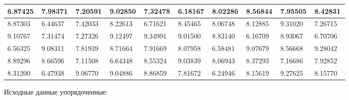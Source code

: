 \begin{changemargin}{-4cm}{0cm}
{\begin{tabular}{|p{0.08\linewidth}|p{0.08\linewidth}|p{0.08\linewidth}|p{0.08\linewidth}|p{0.08\linewidth}|p{0.08\linewidth}|p{0.08\linewidth}|p{0.08\linewidth}|p{0.08\linewidth}|p{0.08\linewidth}|}
\hline%
6.87425&7.98371&7.20591&9.02850&7.32478&6.18167&8.02286&8.56844&7.95505&8.42831\\%
\hline%
8.87303&6.44637&7.42033&8.22613&6.71621&8.45465&8.06748&8.12885&9.31020&7.26715\\%
\hline%
9.10767&7.31474&7.27326&9.12497&9.34991&9.01500&8.83140&6.16709&8.93067&6.70706\\%
\hline%
6.56325&9.08311&7.81939&8.71664&7.91669&8.07958&6.58481&9.07679&8.56668&9.28042\\%
\hline%
8.89296&8.66596&7.11508&6.64348&8.55324&9.03839&8.06943&8.37293&7.16686&7.92852\\%
\hline%
8.31200&6.47938&9.06770&9.04886&8.86859&7.81672&6.24946&8.15619&9.27625&8.15770\\%
\hline%
\end{tabular}%
\newline%
\newline%
%
}\end{changemargin}%
\newpage%
Исходные данные упорядоченные:\newline%
\newline%
%
